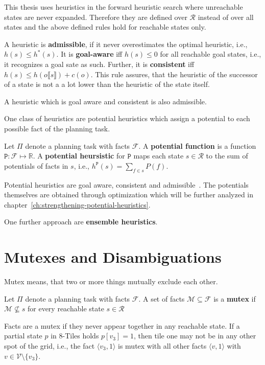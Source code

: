 This thesis uses heuristics in the forward heuristic search where unreachable states are never expanded.
Therefore they are defined over $\mathcal{R}$ instead of over all states and the above defined rules hold for reachable states only.

A heuristic is \textbf{admissible}, if it never overestimates the optimal heuristic, i.e., $h(s)\leq h^*(s)$.
It is \textbf{goal-aware} iff $h(s)\leq 0$ for all reachable goal states, i.e., it recognizes a goal sate as such.
Further, it is \textbf{consistent} iff $h(s)\leq h(o\llbracket s\rrbracket)+c(o)$.
This rule assures, that the heuristic of the successor of a state is not a a lot lower than the heuristic of the state itself.

A heuristic which is goal aware and consistent is also admissible.

One class of heuristics are potential heuristics which assign a potential to each possible fact of the planning task.
\begin{definition}
    Let $\Pi$ denote a planning task with facts $\mathcal{F}$.
    A \textbf{potential function} is a function $\mathtt{P}:\mathcal{F}\mapsto\mathbb{R}$.
    A \textbf{potential heursistic} for $\mathtt{P}$ maps each state $s\in\mathcal{R}$ to the sum of potentials of facts in $s$, i.e., $h^\mathtt{P}(s)=\sum_{f\in s}P(f)$.
\end{definition}

Potential heuristics are goal aware, consistent and admissible~\cite{fivser2020strengthening}.
The potentials themselves are obtained through optimization which will be further analyzed in chapter~\ref{ch:strengthening-potential-heuristics}.

One further approach are \textbf{ensemble heuristics}.

\section{Mutexes and Disambiguations}\label{sec:mutexes-and-disambiguations}
Mutex means, that two or more things mutually exclude each other.

\begin{definition}
    Let $\Pi$ denote a planning task with facts $\mathcal{F}$.
    A set of facts $\mathcal{M}\subseteq \mathcal{F}$ is a \textbf{mutex} if $\mathcal{M}\nsubseteq s$ for every reachable state $s\in\mathcal{R}$
\end{definition}

Facts are a mutex if they never appear together in any reachable state.
If a partial state $p$ in 8-Tiles holds $p[v_3]=1$, then tile one may not be in any other spot of the grid, i.e., the fact $\langle v_3, 1\rangle$ is mutex with all
other facts $\langle v, 1\rangle$ with $v\in \mathcal{V}\setminus \{v_3\}$.

